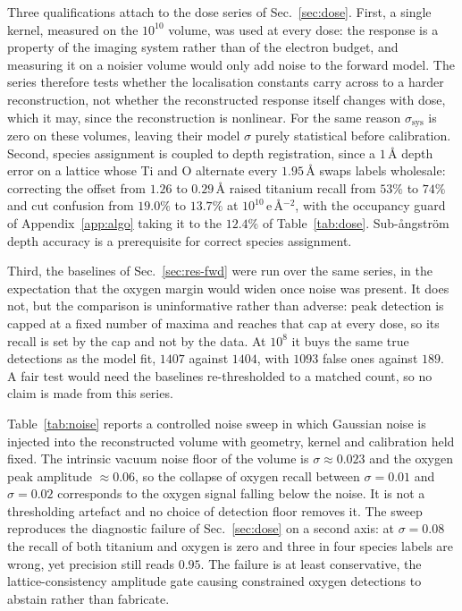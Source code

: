 \documentclass[aps,prb,twocolumn,superscriptaddress,floatfix,nofootinbib]{revtex4-2}
\begin{document}
Three qualifications attach to the dose series of Sec.~\ref{sec:dose}. First, a single kernel, measured on the $10^{10}$ volume, was used at every dose: the response is a property of the imaging system rather than of the electron budget, and measuring it on a noisier volume would only add noise to the forward model. The series therefore tests whether the localisation constants carry across to a harder reconstruction, not whether the reconstructed response itself changes with dose, which it may, since the reconstruction is nonlinear. For the same reason $\sigma_{\mathrm{sys}}$ is zero on these volumes, leaving their model $\sigma$ purely statistical before calibration. Second, species assignment is coupled to depth registration, since a $1$\,\AA{} depth error on a lattice whose Ti and O alternate every $1.95$\,\AA{} swaps labels wholesale: correcting the offset from $1.26$ to $0.29$\,\AA{} raised titanium recall from $53\%$ to $74\%$ and cut confusion from $19.0\%$ to $13.7\%$ at $10^{10}$\,e\,\AA$^{-2}$, with the occupancy guard of Appendix~\ref{app:algo} taking it to the $12.4\%$ of Table~\ref{tab:dose}. Sub-\aa{}ngstr\"om depth accuracy is a prerequisite for correct species assignment.

Third, the baselines of Sec.~\ref{sec:res-fwd} were run over the same series, in the expectation that the oxygen margin would widen once noise was present. It does not, but the comparison is uninformative rather than adverse: peak detection is capped at a fixed number of maxima and reaches that cap at every dose, so its recall is set by the cap and not by the data. At $10^{8}$ it buys the same true detections as the model fit, $1407$ against $1404$, with $1093$ false ones against $189$. A fair test would need the baselines re-thresholded to a matched count, so no claim is made from this series.

Table~\ref{tab:noise} reports a controlled noise sweep in which Gaussian noise is injected into the reconstructed volume with geometry, kernel and calibration held fixed. The intrinsic vacuum noise floor of the volume is $\sigma\approx0.023$ and the oxygen peak amplitude $\approx0.06$, so the collapse of oxygen recall between $\sigma=0.01$ and $\sigma=0.02$ corresponds to the oxygen signal falling below the noise. It is not a thresholding artefact and no choice of detection floor removes it. The sweep reproduces the diagnostic failure of Sec.~\ref{sec:dose} on a second axis: at $\sigma=0.08$ the recall of both titanium and oxygen is zero and three in four species labels are wrong, yet precision still reads $0.95$. The failure is at least conservative, the lattice-consistency amplitude gate causing constrained oxygen detections to abstain rather than fabricate.
\end{document}
